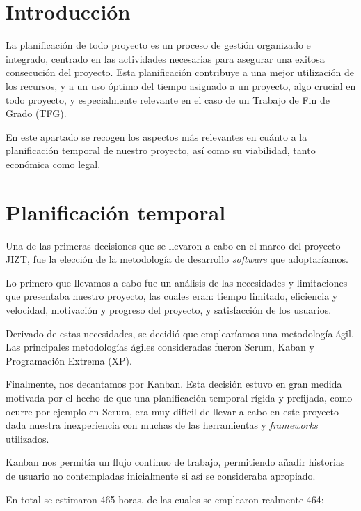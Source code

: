 
\section{Introducción}

La planificación de todo proyecto es un proceso de gestión organizado e integrado, centrado en las actividades necesarias para asegurar una exitosa consecución del proyecto. Esta planificación contribuye a una mejor utilización de los recursos, y a un uso óptimo del tiempo asignado a un proyecto, algo crucial en todo proyecto, y especialmente relevante en el caso de un Trabajo de Fin de Grado (TFG).

En este apartado se recogen los aspectos más relevantes en cuánto a la planificación temporal de nuestro proyecto, así como su viabilidad, tanto económica como legal.

\vspace{1cm}
\section{Planificación temporal}

Una de las primeras decisiones que se llevaron a cabo en el marco del proyecto JIZT, fue la elección de la metodología de desarrollo \emph{software} que adoptaríamos.

Lo primero que llevamos a cabo fue un análisis de las necesidades y limitaciones que presentaba nuestro proyecto, las cuales eran: tiempo limitado, eficiencia y velocidad, motivación y progreso del proyecto, y satisfacción de los usuarios.

Derivado de estas necesidades, se decidió que emplearíamos una metodología ágil. Las principales metodologías ágiles consideradas fueron Scrum, Kaban y Programación Extrema (XP).

Finalmente, nos decantamos por Kanban. Esta decisión estuvo en gran medida motivada por el hecho de que una planificación temporal rígida y prefijada, como ocurre por ejemplo en Scrum, era muy difícil de llevar a cabo en este proyecto dada nuestra inexperiencia con muchas de las herramientas y \emph{frameworks} utilizados.

Kanban nos permitía un flujo continuo de trabajo, permitiendo añadir historias de usuario no contempladas inicialmente si así se consideraba apropiado.

En total se estimaron 465 horas, de las cuales se emplearon realmente 464:

